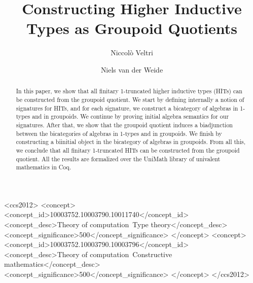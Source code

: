\documentclass[screen]{acmart}
\theoremstyle{plain}
\theoremstyle{definition}
\begin{document}
	
\lstset{language=Coq}

\title{Constructing Higher Inductive Types as Groupoid Quotients}


\author{Niccol{\`o} Veltri}

\author{Niels van der Weide}

\begin{abstract}
	In this paper, we show that all finitary 1-truncated higher inductive types (HITs) can be constructed from the groupoid quotient.
	We start by defining internally a notion of signatures for HITs,
	and for each signature, we construct a bicategory of algebras in 1-types and in groupoids.
	We continue by proving initial algebra semantics for our signatures.
	After that, we show that the groupoid quotient induces a biadjunction between the bicategories of algebras in 1-types and in groupoids.
	We finish by constructing a biinitial object in the bicategory of algebras in groupoids.
	From all this, we conclude that all finitary 1-truncated HITs can be constructed from the groupoid quotient. 
	All the results are formalized over the UniMath library of univalent mathematics in Coq.
\end{abstract}

\begin{CCSXML}
	<ccs2012>
	<concept>
	<concept_id>10003752.10003790.10011740</concept_id>
	<concept_desc>Theory of computation~Type theory</concept_desc>
	<concept_significance>500</concept_significance>
	</concept>
	<concept>
	<concept_id>10003752.10003790.10003796</concept_id>
	<concept_desc>Theory of computation~Constructive mathematics</concept_desc>
	<concept_significance>500</concept_significance>
	</concept>
	</ccs2012>
\end{CCSXML}
\end{document}
